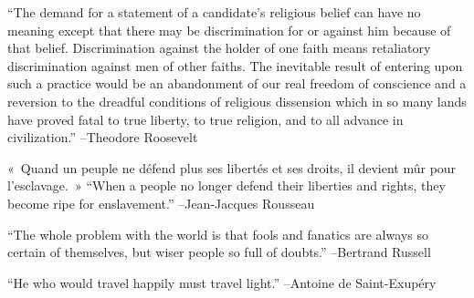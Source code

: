 \documentclass{article}%
\begin{document}
\linebreak%
\vspace{1mm}%
\begin{minipage}{\textwidth}%
\flushleft%
“The demand for a statement of a candidate's religious belief can have no meaning except that there may be discrimination for or against him because of that belief. Discrimination against the holder of one faith means retaliatory discrimination against men of other faiths. The inevitable result of entering upon such a practice would be an abandonment of our real freedom of conscience and a reversion to the dreadful conditions of religious dissension which in so many lands have proved fatal to true liberty, to true religion, and to all advance in civilization.”%
\linebreak%
\vspace{1mm}%
–Theodore Roosevelt%
\linebreak%
\vspace{1mm}%
\end{minipage}%
\linebreak%
\vspace{1mm}%
\begin{minipage}{\textwidth}%
\flushleft%
«~Quand un peuple ne défend plus ses libertés et ses droits, il devient mûr pour l'esclavage.~»%
\linebreak%
\vspace{1mm}%
“When a people no longer defend their liberties and rights, they become ripe for enslavement.”%
\linebreak%
–Jean{-}Jacques Rousseau%
\linebreak%
\vspace{1mm}%
\end{minipage}%
\linebreak%
\vspace{1mm}%
\begin{minipage}{\textwidth}%
\flushleft%
“The whole problem with the world is that fools and fanatics are always so certain of themselves, but wiser people so full of doubts.”%
\linebreak%
\vspace{1mm}%
–Bertrand Russell%
\linebreak%
\vspace{1mm}%
\end{minipage}%
\linebreak%
\vspace{1mm}%
\begin{minipage}{\textwidth}%
\flushleft%
“He who would travel happily must travel light.”%
\linebreak%
\vspace{1mm}%
–Antoine de Saint{-}Exupéry%
\linebreak%
\vspace{1mm}%
\end{minipage}%
\end{document}
